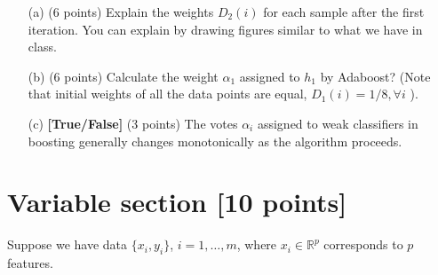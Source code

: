 \documentclass[a4paper,12pt,fleqn]{article}
\begin{document}
\begin{enumerate}
\item[(a)] (6 points) Explain the weights $D_2(i)$ for each sample after the first iteration. You can explain by drawing figures similar to what we have in class. 

\vspace{3cm}

\item[(b)] (6 points) Calculate the weight $\alpha_1$ assigned to $h_1$ by Adaboost? (Note that initial weights of all the data points are equal, $D_1(i) = 1/8, \forall i$ ). 
\vspace{3cm}


\item[(c)] \textbf{[True/False]} (3 points) The votes $\alpha_i$ assigned to weak classifiers in boosting generally changes monotonically as the algorithm proceeds. %



\end{enumerate}


\clearpage

\section{Variable section [10 points]}

Suppose we have data $\{x_i, y_i\}$, $i = 1, \ldots, m$, where $x_i \in \mathbb R^p$ corresponds to $p$ features.
\end{document}
